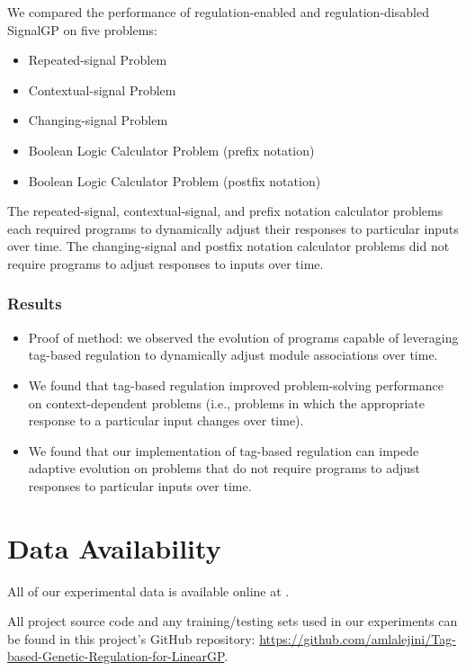 \documentclass[
]{book}
\providecommand{\tightlist}{%
  \setlength{\itemsep}{0pt}\setlength{\parskip}{0pt}}
\begin{document}
We compared the performance of regulation-enabled and regulation-disabled SignalGP on five problems:

\begin{itemize}
\tightlist
\item
  Repeated-signal Problem
\item
  Contextual-signal Problem
\item
  Changing-signal Problem
\item
  Boolean Logic Calculator Problem (prefix notation)
\item
  Boolean Logic Calculator Problem (postfix notation)
\end{itemize}

The repeated-signal, contextual-signal, and prefix notation calculator problems each required programs to dynamically adjust their responses to particular inputs over time.
The changing-signal and postfix notation calculator problems did not require programs to adjust responses to inputs over time.

\hypertarget{results}{%
\subsection{Results}\label{results}}

\begin{itemize}
\tightlist
\item
  Proof of method: we observed the evolution of programs capable of leveraging tag-based regulation to dynamically adjust module associations over time.
\item
  We found that tag-based regulation improved problem-solving performance on context-dependent problems (i.e., problems in which the appropriate response to a particular input changes over time).
\item
  We found that our implementation of tag-based regulation can impede adaptive evolution on problems that do not require programs to adjust responses to particular inputs over time.
\end{itemize}

\hypertarget{data-availability}{%
\chapter{Data Availability}\label{data-availability}}

All of our experimental data is available online at \citep{Lalejini_Moreno_Ofria_Data_2020}.

All project source code and any training/testing sets used in our experiments can be found in this project's GitHub repository: \url{https://github.com/amlalejini/Tag-based-Genetic-Regulation-for-LinearGP}.
\end{document}
